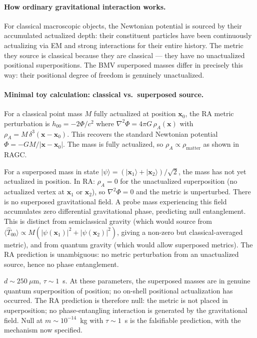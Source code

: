 \documentclass[11pt,a4paper]{article}
\theoremstyle{plain}
\theoremstyle{definition}
\theoremstyle{remark}
\begin{document}
\paragraph{How ordinary gravitational interaction works.}
For classical macroscopic objects, the Newtonian potential is sourced
by their accumulated actualized depth: their constituent particles have
been continuously actualizing via EM and strong interactions for their
entire history. The metric they source is classical because they are
classical --- they have no unactualized positional superpositions.
The BMV superposed masses differ in precisely this way: their positional
degree of freedom is genuinely unactualized.

\paragraph{Minimal toy calculation: classical vs.\ superposed source.}
For a classical point mass $M$ fully actualized at position $\mathbf{x}_0$,
the RA metric perturbation is $h_{00} = -2\Phi/c^2$ where
$\nabla^2\Phi = 4\pi G\,\rho_A(\mathbf{x})$ with $\rho_A = M\,\delta^3(\mathbf{x} - \mathbf{x}_0)$.
This recovers the standard Newtonian potential $\Phi = -GM/|\mathbf{x} - \mathbf{x}_0|$.
The mass is fully actualized, so $\rho_A \propto \rho_{\mathrm{matter}}$
as shown in RAGC.

For a superposed mass in state $|\psi\rangle = (|{\mathbf{x}_1}\rangle +
|{\mathbf{x}_2}\rangle)/\sqrt{2}$, the mass has not yet actualized in position.
In RA: $\rho_A = 0$ for the unactualized superposition (no actualized vertex
at $\mathbf{x}_1$ or $\mathbf{x}_2$), so $\nabla^2\Phi = 0$ and the metric
is unperturbed. There is no superposed gravitational field.
A probe mass experiencing this field accumulates zero differential gravitational
phase, predicting null entanglement.
This is distinct from semiclassical gravity (which would source from
$\langle\hat{T}_{00}\rangle \propto M(|\psi(\mathbf{x}_1)|^2 + |\psi(\mathbf{x}_2)|^2)$,
giving a non-zero but classical-averaged metric), and from quantum gravity
(which would allow superposed metrics). The RA prediction is unambiguous:
no metric perturbation from an unactualized source, hence no phase entanglement.


$d \sim 250~\mu$m, $\tau \sim 1$~s. At these parameters, the
superposed masses are in genuine quantum superposition of position;
no on-shell positional actualization has occurred. The RA prediction
is therefore null: the metric is not placed in superposition;
no phase-entangling interaction is generated by the gravitational field.
Null at $m \sim 10^{-14}$~kg with $\tau \sim 1$~s is the
falsifiable prediction, with the mechanism now specified.
\end{document}
